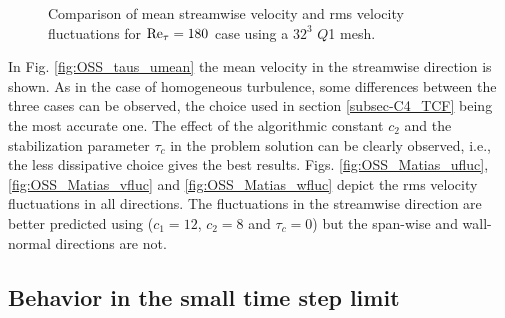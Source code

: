 \begin{figure}[h!]
 	\caption{Comparison of mean streamwise velocity and rms velocity fluctuations for ${\rm Re}_\tau=180$ case using a $32^3$ $Q$1 mesh.}
    \label{fig:OSS_taus_fluc}
\end{figure}

In Fig. \ref{fig:OSS_taus_umean} the mean velocity in the streamwise direction is shown. As in the case of homogeneous turbulence, some differences between the three cases can be observed, the choice used in section \ref{subsec-C4_TCF} being the most accurate one. The effect of the algorithmic constant $c_2$ and the stabilization parameter $\tau_c$ in the problem solution can be clearly observed, i.e., the less dissipative choice gives the best results.
Figs. \ref{fig:OSS_Matias_ufluc}, \ref{fig:OSS_Matias_vfluc} and \ref{fig:OSS_Matias_wfluc} depict the rms velocity fluctuations in all directions. The fluctuations in the streamwise direction are better predicted using ($c_1=12$, $c_2=8$ and $\tau_c=0$) but the span-wise and wall-normal directions are not.

\subsection{Behavior in the small time step limit}
\label{subsec-C4_small_time_step}

